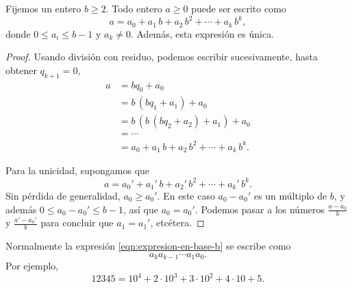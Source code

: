 \begin{teorema}
  Fijemos un entero $b \ge 2$. Todo entero $a \ge 0$ puede ser escrito como
  \begin{equation}
    \label{eqn:expresion-en-base-b}
    a = a_0 + a_1\,b + a_2\,b^2 + \cdots + a_k\,b^k,
  \end{equation}
  donde $0 \le a_i \le b-1$ y $a_k \ne 0$. Además, esta expresión es única.

  \begin{proof}
    Usando división con residuo, podemos escribir sucesivamente, hasta obtener
    $q_{k+1} = 0$,
    \begin{align*}
      a & = b q_0 + a_0 \\
        & = b \, (b q_1 + a_1) + a_0 \\
        & = b \, (b \, (b q_2 + a_2) + a_1) + a_0 \\
        & = \cdots \\
        & = a_0 + a_1\,b + a_2\,b^2 + \cdots + a_k\,b^k.
    \end{align*}

    Para la unicidad, supongamos que
    $$a = a_0' + a_1'\,b + a_2'\,b^2 + \cdots + a_k'\,b^k.$$
    Sin pérdida de generalidad, $a_0 \ge a_0'$. En este caso $a_0 - a_0'$ es un
    múltiplo de $b$, y además $0 \le a_0 - a_0' \le b-1$, así que $a_0 = a_0'$.
    Podemos pasar a los números $\frac{a - a_0}{b}$ y $\frac{a' - a_0'}{b}$ para
    concluir que $a_1 = a_1'$, etcétera.
  \end{proof}
\end{teorema}

\begin{comentario}
  Normalmente la expresión \eqref{eqn:expresion-en-base-b} se escribe como
  $$a_k a_{k-1} \cdots a_1 a_0.$$
  Por ejemplo,
  $$12345 = 10^4 + 2\cdot 10^3 + 3\cdot 10^2 + 4\cdot 10 + 5.$$
\end{comentario}

